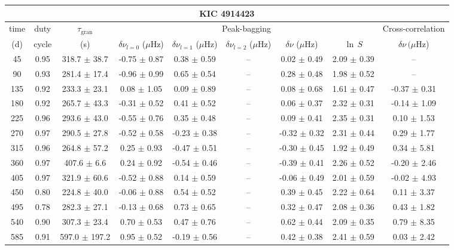 \documentclass[twocolumn]{aastex61}%
\begin{document}
\begin{table*}[ht]\centering\fontsize{9.}{7.}\selectfont
\begin{tabular}{ccc|ccccc|c}
\multicolumn{9}{c}{KIC 4914423}\\ \hline\hline
time & duty & $\tau_\text{gran}$ &\multicolumn{5}{c|}{Peak-bagging}&Cross-correlation\\
(d)& cycle & (s)&$\delta\nu_{l=0}$ ($\mu$Hz) & $\delta\nu_{l=1}$ ($\mu$Hz) & $\delta\nu_{l=2}$ ($\mu$Hz) & $\delta\nu$ ($\mu$Hz)& $\ln\,S$ & $\delta\nu\,(\mu$Hz)\\\hline
45 & 0.95 & 318.7 $\pm$ 38.7 & -0.75 $\pm$ 0.87 & 0.38 $\pm$ 0.59 & -- & 0.02 $\pm$ 0.49 & 2.09 $\pm$ 0.39 & --\\
90 & 0.93 & 281.4 $\pm$ 17.4 & -0.96 $\pm$ 0.99 & 0.65 $\pm$ 0.54 & -- & 0.28 $\pm$ 0.48 & 1.98 $\pm$ 0.52 & --\\
135 & 0.92 & 233.3 $\pm$ 23.1 & 0.08 $\pm$ 1.05 & 0.09 $\pm$ 0.89 & -- & 0.08 $\pm$ 0.68 & 1.61 $\pm$ 0.47 & -0.37 $\pm$ 0.31\\
180 & 0.92 & 265.7 $\pm$ 43.3 & -0.31 $\pm$ 0.52 & 0.41 $\pm$ 0.52 & -- & 0.06 $\pm$ 0.37 & 2.32 $\pm$ 0.31 & -0.14 $\pm$ 1.09\\
225 & 0.96 & 293.6 $\pm$ 43.0 & -0.55 $\pm$ 0.76 & 0.35 $\pm$ 0.48 & -- & 0.09 $\pm$ 0.41 & 2.35 $\pm$ 0.31 & 0.10 $\pm$ 1.53\\
270 & 0.97 & 290.5 $\pm$ 27.8 & -0.52 $\pm$ 0.58 & -0.23 $\pm$ 0.38 & -- & -0.32 $\pm$ 0.32 & 2.31 $\pm$ 0.44 & 0.29 $\pm$ 1.77\\
315 & 0.96 & 264.8 $\pm$ 57.2 & 0.25 $\pm$ 0.93 & -0.47 $\pm$ 0.51 & -- & -0.30 $\pm$ 0.45 & 1.92 $\pm$ 0.49 & 0.34 $\pm$ 5.81\\
360 & 0.97 & 407.6 $\pm$ 6.6 & 0.24 $\pm$ 0.92 & -0.54 $\pm$ 0.46 & -- & -0.39 $\pm$ 0.41 & 2.26 $\pm$ 0.52 & -0.20 $\pm$ 2.46\\
405 & 0.97 & 321.9 $\pm$ 60.6 & -0.52 $\pm$ 0.88 & 0.14 $\pm$ 0.59 & -- & -0.06 $\pm$ 0.49 & 2.01 $\pm$ 0.59 & -0.02 $\pm$ 4.93\\
450 & 0.80 & 224.8 $\pm$ 40.0 & -0.06 $\pm$ 0.88 & 0.54 $\pm$ 0.52 & -- & 0.39 $\pm$ 0.45 & 2.22 $\pm$ 0.64 & 0.11 $\pm$ 3.37\\
495 & 0.78 & 282.3 $\pm$ 27.1 & -0.13 $\pm$ 0.68 & 0.73 $\pm$ 0.65 & -- & 0.32 $\pm$ 0.47 & 2.08 $\pm$ 0.36 & 0.43 $\pm$ 1.82\\
540 & 0.90 & 307.3 $\pm$ 23.4 & 0.70 $\pm$ 0.53 & 0.47 $\pm$ 0.76 & -- & 0.62 $\pm$ 0.44 & 2.09 $\pm$ 0.35 & 0.79 $\pm$ 8.35\\
585 & 0.91 & 597.0 $\pm$ 197.2 & 0.95 $\pm$ 0.52 & -0.19 $\pm$ 0.56 & -- & 0.42 $\pm$ 0.38 & 2.41 $\pm$ 0.59 & 0.03 $\pm$ 2.42\\

\end{tabular}
\end{table*}
\end{document}
